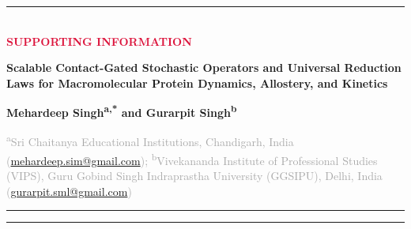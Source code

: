 \documentclass[10pt,letterpaper]{article}
\begin{document}
\color{charcoal}

\begin{center}
  \textcolor{navyblue}{\rule{\textwidth}{2.2pt}}\vspace{5pt}\\
  {\sffamily\bfseries\fontsize{10pt}{12pt}\selectfont\textcolor{crimson}{SUPPORTING INFORMATION}}\vspace{4pt}\\
  {\sffamily\bfseries\fontsize{15pt}{18.2pt}\selectfont\textcolor{navyblue}{Scalable Contact-Gated Stochastic Operators and Universal Reduction Laws for Macromolecular Protein Dynamics, Allostery, and Kinetics}\par}
  \vspace{6pt}
  {\sffamily\bfseries\fontsize{9.8pt}{12pt}\selectfont Mehardeep Singh\textsuperscript{a,*} and Gurarpit Singh\textsuperscript{b}\par}
  \vspace{3pt}
  {\fontsize{8.4pt}{10.2pt}\selectfont\textcolor{darkgray}{\textsuperscript{a}Sri Chaitanya Educational Institutions, Chandigarh, India (\href{mailto:mehardeep.sim@gmail.com}{mehardeep.sim@gmail.com}); \textsuperscript{b}Vivekananda Institute of Professional Studies (VIPS), Guru Gobind Singh Indraprastha University (GGSIPU), Delhi, India (\href{mailto:gurarpit.sml@gmail.com}{gurarpit.sml@gmail.com})}\par}
  \vspace{4pt}
  \textcolor{navyblue}{\rule{\textwidth}{1pt}}
\end{center}

{\footnotesize\tableofcontents}
\vspace{6pt}
\noindent\textcolor{darkgray}{\rule{\textwidth}{0.4pt}}
\end{document}
